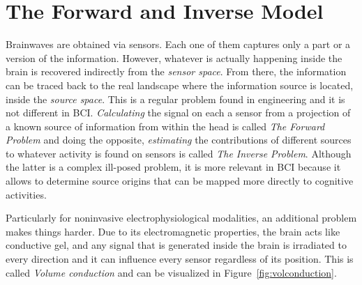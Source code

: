 \section{The Forward and Inverse Model}

Brainwaves are obtained via sensors. Each one of them captures only a part or a version of the information.  However, whatever is actually happening inside the brain is recovered indirectly from the \textit{sensor space}. From there, the information can be traced back to the real landscape where the information source is located, inside the \textit{source space}.  This is a regular problem found in engineering and it is not different in BCI.  \textit{Calculating} the signal on each a sensor from a projection of a known source of information from within the head is called \textit{The Forward Problem}\cite{Parra2008,WolpawJonathanR2012}  and doing the opposite, \textit{estimating} the contributions of different sources to whatever activity is found on sensors is called  \textit{The Inverse Problem}.  Although the latter is a complex ill-posed problem, it is more relevant in BCI because it allows to determine source origins that can be mapped more directly to cognitive activities. 

Particularly for noninvasive electrophysiological modalities, an additional problem makes things harder.  Due to its electromagnetic properties, the brain acts like conductive gel, and any signal that is generated inside the brain is irradiated to every direction and it can influence every sensor regardless of its position.  This is called \textit{Volume conduction} \cite{Nam2018,Buzsaki2012} and can be visualized in Figure~\ref{fig:volconduction}.

